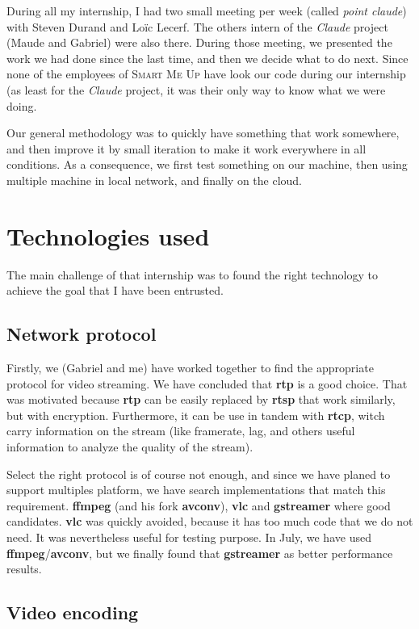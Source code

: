 \documentclass[a4paper,11pt]{custom}
\newcommand{\smu}{\textsc{Smart Me Up}}
\newcommand{\rtp}{\textbf{rtp}\xspace}
\newcommand{\rtcp}{\textbf{rtcp}\xspace}
\newcommand{\rtsp}{\textbf{rtsp}\xspace}
\newcommand{\vlc}{\textbf{vlc}\xspace}
\newcommand{\avconv}{\textbf{avconv}\xspace}
\newcommand{\ffmpeg}{\textbf{ffmpeg}\xspace}
\newcommand{\gstreamer}{\textbf{gstreamer}\xspace}
\newcommand{\claude}{\textit{Claude}\xspace}
\begin{document}
During all my internship, I had two small meeting per week (called \textit{point
claude}) with Steven Durand and Loïc Lecerf. The others intern of the \claude{}
project (Maude and Gabriel) were also there. During those meeting, we presented
the work we had done since the last time, and then we decide what to do next.
Since none of the employees of \smu{} have look our code during our internship (as
least for the \claude{} project, it was their only way to know what we were
doing.

Our general methodology was to quickly have something that work somewhere, and
then improve it by small iteration to make it work everywhere in all conditions.
As a consequence, we first test something on our machine, then using multiple
machine in local network, and finally on the cloud.


\section{Technologies used}
\label{sec:technologies}

The main challenge of that internship was to found the right technology to
achieve the goal that I have been entrusted.

\subsection{Network protocol}

Firstly, we (Gabriel and me) have worked together to find the appropriate
protocol for video streaming. We have concluded that \rtp{} is a good choice.
That was motivated because \rtp{} can be easily replaced by \rtsp{} that work
similarly, but with encryption. Furthermore, it can be use in tandem with
\rtcp, witch carry information on the stream (like framerate, lag, and others
useful information to analyze the quality of the stream).

Select the right protocol is of course not enough, and since we have planed to
support multiples platform, we have search implementations that match this
requirement. \ffmpeg{} (and his fork \avconv), \vlc{} and \gstreamer{} where good
candidates. \vlc{} was quickly avoided, because it has too much code that we do
not need. It was nevertheless useful for testing purpose. In July, we have used
\ffmpeg/\avconv, but we finally found that \gstreamer{} as better performance
results.

\subsection{Video encoding}
\end{document}
